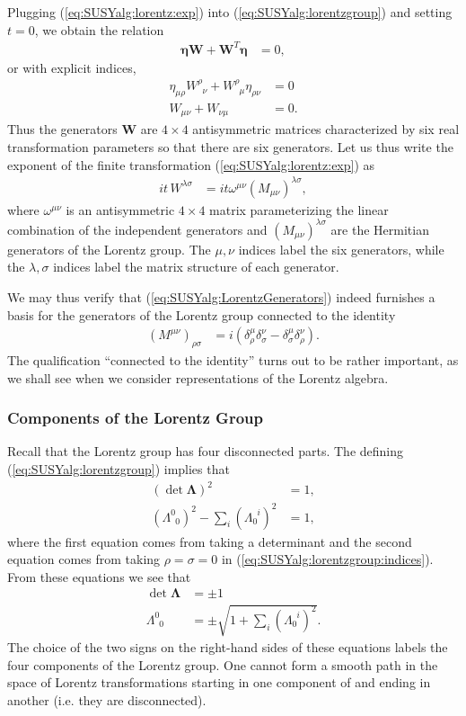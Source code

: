 \documentclass[12pt, oneside]{report}    %
\begin{document}
Plugging (\ref{eq:SUSYalg:lorentz:exp}) into  (\ref{eq:SUSYalg:lorentzgroup}) and setting $t=0$, we obtain the relation
\begin{align}
    \mathbf{\eta} \mathbf{W} + \mathbf{W}^T \mathbf{\eta} &= 0,
\end{align}
or with explicit indices,
\begin{align}
    \eta_{\mu\rho}W^\rho_{\phantom\rho\nu} + W^\rho_{\phantom\rho\mu}\eta_{\rho\nu} &=0\\
    W_{\mu\nu} + W_{\nu\mu} &= 0.
\end{align}
Thus the generators $\mathbf{W}$ are $4\times 4$ antisymmetric matrices characterized by six real transformation parameters so that there are six generators. Let us thus write the exponent of the finite transformation (\ref{eq:SUSYalg:lorentz:exp}) as
\begin{align}
    it\,W^{\lambda\sigma} &= i t\omega^{\mu\nu}\left(M_{\mu\nu}\right)^{\lambda\sigma},
\end{align}
where $\omega^{\mu\nu}$ is an antisymmetric $4 \times 4$ matrix parameterizing the linear combination of the independent generators and $\left(M_{\mu\nu}\right)^{\lambda\sigma}$ are the Hermitian generators of the Lorentz group. The $\mu,\nu$ indices label the six generators, while the $\lambda,\sigma$ indices label the matrix structure of each generator.

We may thus verify that  (\ref{eq:SUSYalg:LorentzGenerators}) indeed furnishes a basis for the generators of the Lorentz group connected to the identity
\begin{align}
(M^{\mu\nu})_{\rho\sigma}&=i(\delta^\mu_\rho\delta^\nu_\sigma-\delta^\mu_\sigma\delta^\nu_\rho).
\end{align}
The qualification ``connected to the identity'' turns out to be rather important, as we shall see when we consider representations of the Lorentz algebra.

\subsubsection{Components of the Lorentz Group}

Recall that the Lorentz group has four disconnected parts. The defining  (\ref{eq:SUSYalg:lorentzgroup}) implies that 
\begin{align}
    \left(\det \mathbf\Lambda\right)^2 &= 1,\\
    (\Lambda^0_{\phantom{0}0})^2-\sum_i(\Lambda_0^{\phantom{0}i})^2 &=1,
\end{align}
where the first equation comes from taking a determinant and the second equation comes from taking $\rho=\sigma=0$ in  (\ref{eq:SUSYalg:lorentzgroup:indices}). From these equations we see that 
\begin{align}
    \det\mathbf\Lambda &= \pm 1\\
    \Lambda^0_{\phantom 00} &= \pm \sqrt{1+\sum_i(\Lambda_0^{\phantom{0}i})^2}.
\end{align}
The choice of the two signs on the right-hand sides of these equations labels the four components of the Lorentz group. One cannot form a smooth path in the space of Lorentz transformations starting in one component of and ending in another (i.e. they are disconnected).
\end{document}

